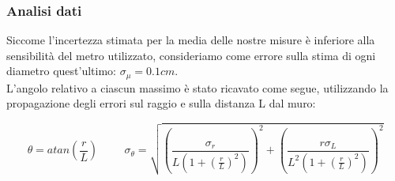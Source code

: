 \documentclass{article}
\theoremstyle{definition}
\begin{document}
\begin{figure}[!htbp]
    	\captionsetup{labelformat=empty}
    \end{figure}

\subsubsection{Analisi dati}
Siccome l'incertezza stimata per la media delle nostre misure è inferiore alla sensibilità del metro utilizzato, consideriamo come errore sulla stima di ogni diametro quest'ultimo: \(\sigma_{\mu} = 0.1cm\).\\
L'angolo relativo a ciascun massimo è stato ricavato come segue, utilizzando la propagazione degli errori sul raggio e sulla distanza L dal muro:

\[\theta = atan\left (\frac{r}{L}\right ) \hspace{1cm}
\sigma_{\theta} = \sqrt{ \left(\frac{\sigma_{r}}{  L(1 + \left (\frac{r}{L} \right )^{2}) } \right )^{2} + \left (\frac{r\sigma_{L}}{L^{2}(1 + \left (\frac{r}{L}\right )^{2}) } \right )^{2} }\]
\end{document}
